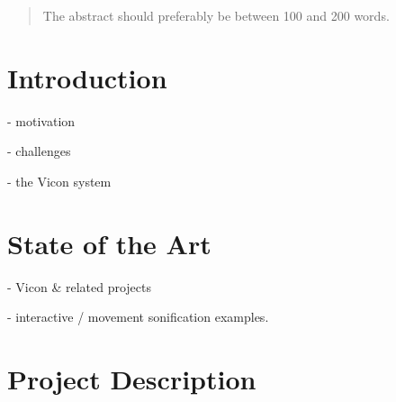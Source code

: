 \documentclass{nime-alternate}
\begin{document}
\date{20 Jan 2017}

\maketitle
\begin{abstract}

The abstract should preferably be between 100 and 200 words.
\end{abstract}






\section{Introduction}

- motivation

- challenges

- the Vicon system

\section{State of the Art}

- Vicon \& related projects

- interactive / movement sonification examples\cite{hermann2011sonification}.

\section{Project Description}
\end{document}

